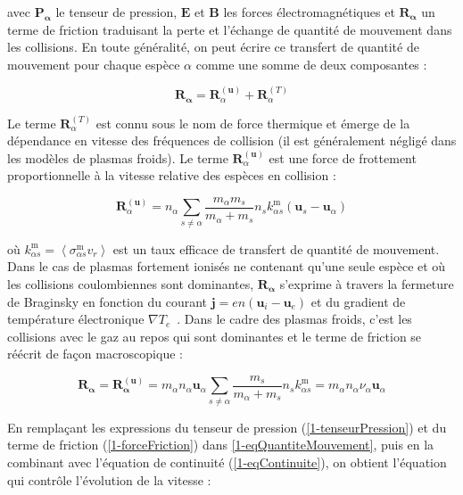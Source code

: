 \begin{refsection}
avec $\mathbf{P_\alpha}$ le tenseur de pression, $\mathbf{E}$ et $\mathbf{B}$
les forces électromagnétiques et $\mathbf{R_\alpha}$ un terme de
friction traduisant la perte et l'échange de quantité de mouvement dans les
collisions. En toute généralité, on peut écrire ce transfert de quantité de
mouvement pour chaque espèce $\alpha$ comme une somme de deux composantes :

\begin{equation}
\mathbf{R_\alpha}=\mathbf{R}_{\alpha}^{(\mathbf
u)}+\mathbf{R}_{\alpha}^{(T)}
\end{equation}

Le terme
$\mathbf{R}_{\alpha}^{(T)}$ est connu sous le nom de force thermique et
émerge de la dépendance en vitesse des fréquences de collision (il est
généralement négligé dans les modèles de plasmas froids).
Le terme $\mathbf{R}_{\alpha}^{(\mathbf u)}$ est une force de frottement
proportionnelle à la vitesse relative des espèces en collision :

\begin{equation}
\mathbf{R}_{\alpha}^{(\mathbf
u)}=n_\alpha\sum_{s\neq\alpha}\frac{m_\alpha m_s}{m_\alpha+m_s}
n_sk^\text{m}_{\alpha s} \left(\mathbf u_s-\mathbf u_\alpha\right)
\end{equation}

où $k^\text{m}_{\alpha s}=\left<\sigma^\text{m}_{\alpha s}v_r\right>$ est un
taux efficace de transfert de quantité de mouvement.
Dans le cas de plasmas fortement ionisés ne contenant qu'une seule espèce et où
les collisions coulombiennes sont dominantes, $\mathbf{R_\alpha}$ s'exprime à
travers la fermeture de Braginsky en fonction du courant $\mathbf
j=en\left(\mathbf u_i-\mathbf u_e\right)$ et du gradient de température
électronique $\nabla T_e$~\parencite{Braginsky}. Dans le cadre des plasmas
froids, c'est les collisions avec le gaz au repos qui sont dominantes et le
terme de friction se réécrit de façon macroscopique :

\begin{equation}
\label{1-forceFriction}
\mathbf{R_{\alpha}}=\mathbf{R_{\alpha}^{(\mathbf
u)}}=m_\alpha n_\alpha\mathbf u_\alpha\sum_{s\neq\alpha}\frac{m_s}{m_\alpha+m_s}
n_sk^\text{m}_{\alpha s} = m_\alpha n_\alpha \nu_\alpha \mathbf u_\alpha
\end{equation}

En remplaçant les expressions du
tenseur de pression (\eqref{1-tenseurPression}) et du terme de friction (\eqref{1-forceFriction}) dans
\eqref{1-eqQuantiteMouvement}, puis en la combinant avec l'équation de
continuité (\eqref{1-eqContinuite}), on obtient l'équation qui contrôle
l'évolution de la vitesse :


\end{refsection}
